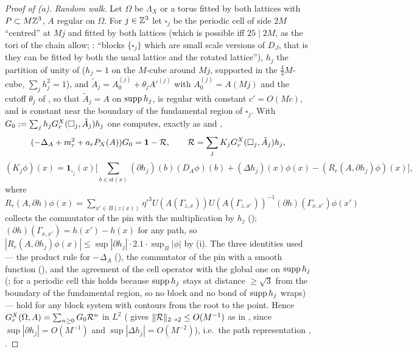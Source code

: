 
\begin{proof}[Proof of (a)]
\emph{Random walk.} Let $\Omega$ be $\Lambda_X$ or a torus fitted by both lattices with $P\subset M\mathbb Z^3$, $A$ regular on $\Omega$. For $j\in\mathbb Z^3$ let $\square_j$ be the periodic cell of side $2M$ ``centred'' at $Mj$ and fitted by both lattices (which is possible iff $25\mid2M$, as the tori of the chain allow; \cite[p.~345]{K2}: ``blocks $\{\square_j\}$ which are small scale versions of $D_J$, that is they can be fitted by both the usual lattice and the rotated lattice''), $h_j$ the partition of unity of \cite[\S2]{Ba4} ($h_j=1$ on the $M$-cube around $Mj$, supported in the $\frac43M$-cube, $\sum_jh_j^2=1$), and $\tilde A_j=A_0^{(j)}+\theta_jA'^{(j)}$ with $A_0^{(j)}=A(Mj)$ and the cutoff $\theta_j$ of \cite[p.~575]{Ba4}, so that $\tilde A_j=A$ on $\operatorname{supp} h_j$, is regular with constant $c'=O(Mc)$, and is constant near the boundary of the fundamental region of $\square_j$. With $G_0:=\sum_jh_jG^X_r(\square_j,\tilde A_j)h_j$ one computes, exactly as \cite[(2.3)--(2.9)]{Ba4} and \cite[(5.8)--(5.12)]{K2},
\[
(-\Delta_A+m_r^2+a_rP_X(A))G_0=\mathbf 1-\mathcal R,\qquad \mathcal R=\sum_jK_jG^X_r(\square_j,\tilde A_j)h_j,
\]
\[
(K_j\phi)(x)=\mathbf 1_{\square_j}(x)\Big[\sum_{b\in\mathrm{st}(x)}(\partial h_j)(b)(D_A\phi)(b)+(\Delta h_j)(x)\phi(x)-(R_r(A,\partial h_j)\phi)(x)\Big],
\]
where $R_r(A,\partial h)\phi(x)=\sum_{x'\in B(z(x))}\eta'^3U(A(\Gamma_{z,x}))U(A(\Gamma_{z,x'}))^{-1}(\partial h)(\Gamma_{x,x'})\phi(x')$ collects the commutator of the pin with the multiplication by $h_j$ (\cite[(2.8)]{Ba4}); $(\partial h)(\Gamma_{x,x'})=h(x')-h(x)$ for any path, so $|R_r(A,\partial h_j)\phi(x)|\le\sup|\partial h_j|\cdot2.1\cdot\sup_B|\phi|$ by (i). The three identities used --- the product rule for $-\Delta_A$ (\cite[(2.5)]{Ba4}), the commutator of the pin with a smooth function (\cite[(2.8)]{Ba4}), and the agreement of the cell operator with the global one on $\operatorname{supp} h_j$ (\cite[(2.6)]{Ba4}; for a periodic cell this holds because $\operatorname{supp} h_j$ stays at distance $\ge\sqrt3$ from the boundary of the fundamental region, so no block and no bond of $\operatorname{supp} h_j$ wraps) --- hold for any block system with contours from the root to the point. Hence $G^X_r(\Omega,A)=\sum_{n\ge0}G_0\mathcal R^n$ in $L^2$ ( gives $\|\mathcal R\|_{2\to2}\le O(M^{-1})$ as in \cite{Ba4}, since $\sup|\partial h_j|=O(M^{-1})$ and $\sup|\Delta h_j|=O(M^{-2})$), i.e.\ the path representation \cite[(2.13)]{Ba4}, \cite[(5.56)]{K2}.


\end{proof}

